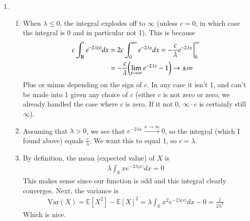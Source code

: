\documentclass[12pt]{article}
\def\mbb#1{\mathbb{#1}}
\def \R{\mbb{R}}
\newcommand{\E}{\mathbb{E}}
\newcommand{\Var}{\mathrm{Var}}
\begin{document}
\begin{enumerate}[leftmargin=\labelsep]
		\newpage
		\item \begin{enumerate}
			\item When $\lambda \leq 0$, the integral explodes off to $\infty$ (unless $c = 0$, in which case the integral is 0 and in particular not 1). This is because
			\begin{align*}
				c\int_\R e^{-2\lambda|x|}dx &= 2c\int_0^\infty e^{-2\lambda x}dx = -\frac{c}{\lambda} e^{-2\lambda x} \eval_0^\infty \\
				&= -\frac{c}{\lambda} \qty(\lim_{x \to \infty} e^{-2 \lambda x} - 1) \to \pm \infty
			\end{align*}
			Plus or minus depending on the sign of $c$. In any case it isn't 1, and can't be made into 1 given any choice of $c$ (either $c$ is not zero or zero, we already handled the case where $c$ is zero. If it not 0, $\infty \cdot c$ is certainly still $\infty$).
			
			\item Assuming that $\lambda > 0$, we see that $e^{-2\lambda x} \overset{x \to \infty}{\to} 0$, so the integral (which I found above) equals $\frac{c}{\lambda}$. We want this to equal 1, so $c = \lambda$.
			
			\item By definition, the mean (expected value) of $X$ is 
			\begin{align*}
				\lambda \int_\R xe^{-2\lambda|x|}dx = 0
			\end{align*}
			This makes sense since our function is odd and this integral clearly converges. Next, the variance is 
			\begin{align*}
				\Var(X) = \E[X^2] - \E[X]^2 = \lambda \int_\R x^2e^{-2\lambda|x|}dx - 0 = \frac{1}{2\lambda^2}
			\end{align*}
			Which is nice.
			

\end{enumerate}
\end{enumerate}
\end{document}
